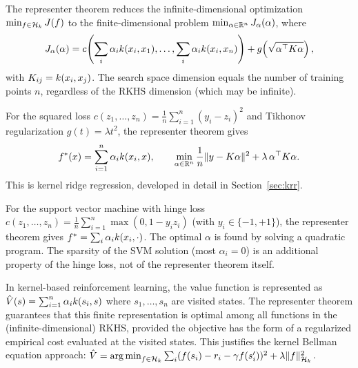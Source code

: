 \documentclass[11pt,a4paper]{article}
\begin{document}
\begin{keyresult}[title={Representer Theorem: From Infinite to Finite Dimensions}]
The representer theorem reduces the infinite-dimensional optimization
$\min_{f \in \mathcal{H}_k} J(f)$ to the finite-dimensional problem
$\min_{\alpha \in \mathbb{R}^n} J_\alpha(\alpha)$, where
\[
J_\alpha(\alpha) = c\!\left(\sum_{i} \alpha_i k(x_i, x_1),
\ldots, \sum_{i} \alpha_i k(x_i, x_n)\right) +
g\!\left(\sqrt{\alpha^\top K \alpha}\right),
\]
with $K_{ij} = k(x_i, x_j)$. The search space dimension equals
the number of training points $n$, regardless of the RKHS dimension
(which may be infinite).
\end{keyresult}

\begin{example}
\label{ex:representer-squared}
For the squared loss $c(z_1, \ldots, z_n) = \frac{1}{n}
\sum_{i=1}^n (y_i - z_i)^2$ and Tikhonov regularization
$g(t) = \lambda t^2$, the representer theorem gives
\[
f^*(x) = \sum_{i=1}^n \alpha_i k(x_i, x), \qquad
\min_{\alpha \in \mathbb{R}^n} \frac{1}{n} \|y - K\alpha\|^2 +
\lambda \, \alpha^\top K \alpha.
\]
This is kernel ridge regression, developed in detail in
Section~\ref{sec:krr}.
\end{example}

\begin{example}
\label{ex:representer-svm}
For the support vector machine with hinge loss
$c(z_1, \ldots, z_n) = \frac{1}{n} \sum_{i=1}^n \max(0,
1 - y_i z_i)$ (with $y_i \in \{-1, +1\}$), the representer
theorem gives $f^* = \sum_i \alpha_i k(x_i, \cdot)$.
The optimal $\alpha$ is found by solving a quadratic program.
The sparsity of the SVM solution (most $\alpha_i = 0$) is an
additional property of the hinge loss, not of the representer
theorem itself.
\end{example}

\begin{rlconnection}[title={Representer Theorem and Nonparametric RL}]
In kernel-based reinforcement learning, the value function is
represented as $\hat{V}(s) = \sum_{i=1}^n \alpha_i k(s_i, s)$
where $s_1, \ldots, s_n$ are visited states. The representer
theorem guarantees that this finite representation is optimal among
all functions in the (infinite-dimensional) RKHS, provided the
objective has the form of a regularized empirical cost evaluated
at the visited states. This justifies the kernel Bellman equation
approach: $\hat{V} = \operatorname{arg\,min}_{f \in \mathcal{H}_k} \sum_i (f(s_i) -
r_i - \gamma f(s_i'))^2 + \lambda \|f\|_{\mathcal{H}_k}^2$.
\end{rlconnection}
\end{document}

